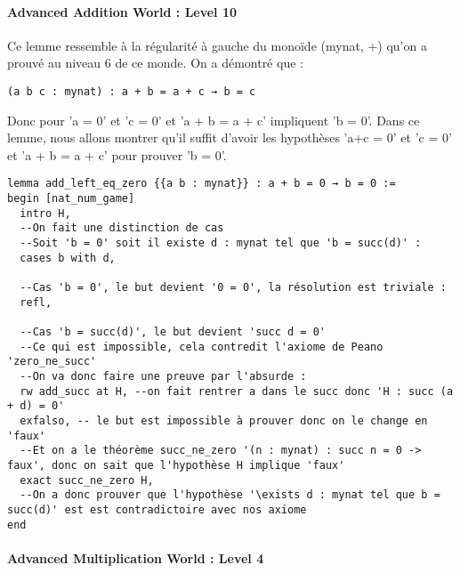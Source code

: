 \paragraph{Advanced Addition World : Level 10}

Ce lemme ressemble à la régularité à gauche du monoïde (mynat, +) qu'on a prouvé au niveau 6 de ce monde.
On a démontré que :
\begin{verbatim}
(a b c : mynat) : a + b = a + c → b = c
\end{verbatim}
Donc pour 'a = 0' et 'c = 0' et 'a + b = a + c' impliquent 'b = 0'.
Dans ce lemme, nous allons montrer qu'il suffit d'avoir les hypothèses 'a+c = 0' et 'c = 0' et 'a + b = a + c' pour prouver 'b = 0'.

\begin{verbatim}
lemma add_left_eq_zero {{a b : mynat}} : a + b = 0 → b = 0 :=
begin [nat_num_game]
  intro H,
  --On fait une distinction de cas
  --Soit 'b = 0' soit il existe d : mynat tel que 'b = succ(d)' :
  cases b with d,

  --Cas 'b = 0', le but devient '0 = 0', la résolution est triviale :
  refl,

  --Cas 'b = succ(d)', le but devient 'succ d = 0'
  --Ce qui est impossible, cela contredit l'axiome de Peano 'zero_ne_succ'
  --On va donc faire une preuve par l'absurde :
  rw add_succ at H, --on fait rentrer a dans le succ donc 'H : succ (a + d) = 0'
  exfalso, -- le but est impossible à prouver donc on le change en 'faux'
  --Et on a le théorème succ_ne_zero '(n : mynat) : succ n = 0 -> faux', donc on sait que l'hypothèse H implique 'faux'
  exact succ_ne_zero H,
  --On a donc prouver que l'hypothèse '\exists d : mynat tel que b = succ(d)' est est contradictoire avec nos axiome
end
\end{verbatim}

\paragraph{Advanced Multiplication World : Level 4}

